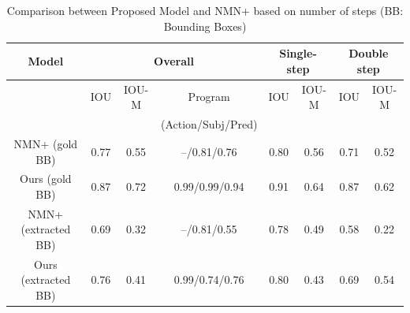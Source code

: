 \label{sec:evaluation}
%

\begin{table}[ht]
    \centering
    \caption{Comparison between Proposed Model and NMN+ based on number of steps (BB: Bounding Boxes)}
    \begin{tabular}{|c|c|c|c|c|c|c|c|}
    \hline
         Model  & \multicolumn{3}{|c|}{Overall} &  \multicolumn{2}{|c|}{Single-step} & \multicolumn{2}{|c|}{Double step} \\ 
         \hline
         \hline
          & IOU & IOU-M & Program & IOU & IOU-M  & IOU & IOU-M \\
           &  &  & (Action/Subj/Pred) & &   &  &  \\
          \hline
         NMN+ (gold BB) & 0.77 & 0.55 & --/0.81/0.76 & 0.80 & 0.56 &    0.71 & 0.52 \\ 
         \hline 
         Ours (gold BB)  & 0.87 & 0.72& 0.99/0.99/0.94 & 0.91 & 0.64 &   0.87 & 0.62 \\
        \hline 
         NMN+ (extracted BB) & 0.69 & 0.32& --/0.81/0.55 & 0.78 & 0.49 &  0.58 & 0.22 \\ 
         \hline 
         Ours (extracted BB) & 0.76  & 0.41  & 0.99/0.74/0.76 &0.80 & 0.43  & 0.69 & 0.54 \\
         \hline 
    \end{tabular}
    \label{tab:accuracy}
\end{table} 

